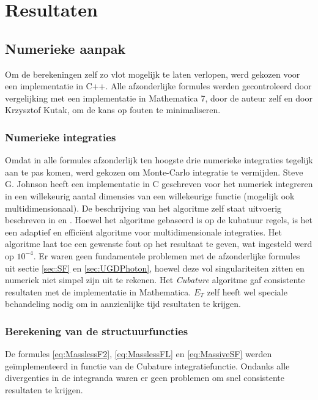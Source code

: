 \documentclass[a4paper,11pt]{article}
\numberwithin{equation}{section} %
\begin{document}
\section{Resultaten}

  \subsection{Numerieke aanpak}
Om de berekeningen zelf zo vlot mogelijk te laten verlopen, werd gekozen voor een implementatie in C++.
Alle afzonderlijke formules werden gecontroleerd door vergelijking met een implementatie in Mathematica 7, door de auteur zelf en door Krzysztof Kutak, om de kans op fouten te minimaliseren.

  \subsubsection{Numerieke integraties}
Omdat in alle formules afzonderlijk ten hoogste drie numerieke integraties tegelijk aan te pas komen, werd gekozen om Monte-Carlo integratie te vermijden.
Steve G. Johnson heeft een implementatie in C geschreven voor het numeriek integreren in een willekeurig aantal dimensies van een willekeurige functie (mogelijk ook multidimensionaal).
De beschrijving van het algoritme zelf staat uitvoerig beschreven in \cite{Genz} en \cite{Berntsen}.
Hoewel het algoritme gebaseerd is op de kubatuur regels, is het een adaptief en efficiënt algoritme voor multidimensionale integraties.
Het algoritme laat toe een gewenste fout op het resultaat te geven, wat ingesteld werd op $10^{-4}$.
Er waren geen fundamentele problemen met de afzonderlijke formules uit sectie \ref{sec:SF} en \ref{sec:UGDPhoton}, hoewel deze vol singulariteiten zitten en numeriek niet simpel zijn uit te rekenen.
Het \textit{Cubature} algoritme gaf consistente resultaten met de implementatie in Mathematica.
$E_T$ zelf heeft wel speciale behandeling nodig om in aanzienlijke tijd resultaten te krijgen.

    \subsubsection{Berekening van de structuurfuncties}
De formules \eqref{eq:MasslessF2}, \eqref{eq:MasslessFL} en \eqref{eq:MassiveSF} werden geïmplementeerd in functie van de Cubature integratiefunctie.
Ondanks alle divergenties in de integranda waren er geen problemen om snel consistente resultaten te krijgen.
\end{document}
